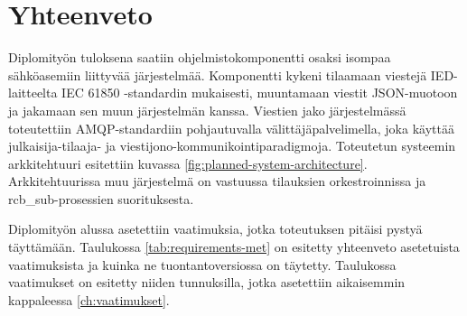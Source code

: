 \chapter{Yhteenveto}
\label{ch:yhteenveto}
Diplomityön tuloksena saatiin ohjelmistokomponentti osaksi isompaa sähköasemiin liittyvää järjestelmää. Komponentti kykeni tilaamaan viestejä IED-laitteelta IEC 61850 -stan\-dar\-din mukaisesti, muuntamaan viestit JSON-muotoon ja jakamaan sen muun järjestelmän kanssa. Viestien jako järjestelmässä toteutettiin AMQP-standardiin pohjautuvalla välittäjäpalvelimella, joka käyttää julkaisija-tilaaja- ja viestijono-kom\-mu\-ni\-koin\-ti\-pa\-ra\-dig\-mo\-ja. Toteutetun systeemin arkkitehtuuri esitettiin kuvassa \ref{fig:planned-system-architecture}. Arkkitehtuurissa muu järjestelmä on vastuussa tilauksien orkestroinnissa ja rcb\_sub-prosessien suorituksesta.

Diplomityön alussa asetettiin vaatimuksia, jotka toteutuksen pitäisi pystyä täyttämään. Taulukossa \ref{tab:requirements-met} on esitetty yhteenveto asetetuista vaatimuksista ja kuinka ne tuontantoversiossa on täytetty. Taulukossa vaatimukset on esitetty niiden tunnuksilla, jotka asetettiin aikaisemmin kappaleessa \ref{ch:vaatimukset}.

